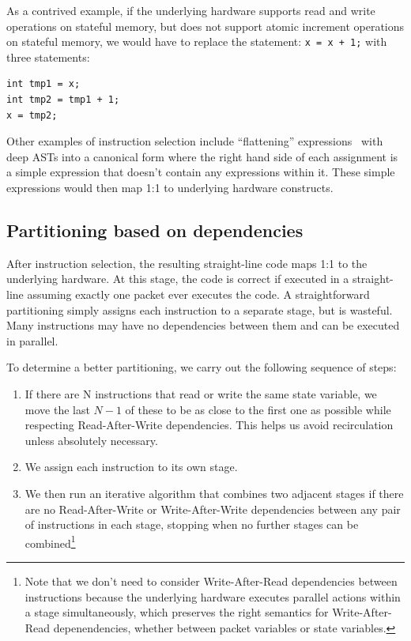 As a contrived example, if the underlying hardware supports read and write
operations on stateful memory, but does not support atomic increment operations
on stateful memory, we would have to replace the statement: \texttt{x = x + 1;}
with three statements:
\begin{verbatim}
int tmp1 = x;
int tmp2 = tmp1 + 1;
x = tmp2;
\end{verbatim}

Other examples of instruction selection include ``flattening''
expressions~\cite{expression_flattening} with deep ASTs into a canonical form
where the right hand side of each assignment is a simple expression that
doesn't contain any expressions within it. These simple expressions would then
map 1:1 to underlying hardware constructs.

\subsection{Partitioning based on dependencies}


After instruction selection, the resulting straight-line code maps 1:1 to the
underlying hardware. At this stage, the code is correct if executed in a
straight-line assuming exactly one packet ever executes the code. A
straightforward partitioning simply assigns each instruction to a separate
stage, but is wasteful. Many instructions may have no dependencies between them
and can be executed in parallel.

To determine a better partitioning, we carry out the following sequence of steps:
\begin{enumerate}
\item If there are N instructions that read or write the same state variable,
we move the last $N-1$ of these to be as close to the first one as possible
while respecting Read-After-Write dependencies. This helps us avoid
recirculation unless absolutely necessary.
\item We assign each instruction to its own stage.
\item We then run an iterative algorithm that combines two adjacent stages if
there are no Read-After-Write or Write-After-Write dependencies between any
pair of instructions in each stage, stopping when no further stages can be
combined\footnote{Note that we don't need to consider Write-After-Read dependencies
between instructions because the underlying hardware executes parallel actions within
a stage simultaneously, which preserves the right semantics for Write-After-Read
depenendencies, whether between packet variables or state variables.}
\end{enumerate}

